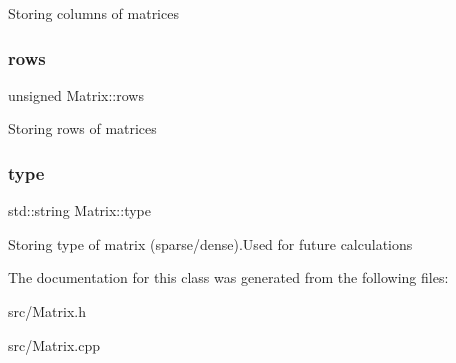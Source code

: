 Storing columns of matrices \mbox{\label{class_matrix_ac1345e89dbffc411f5766c11fc8ebb6a}} 
\subsubsection{\texorpdfstring{rows}{rows}}
{\footnotesize\ttfamily unsigned Matrix\+::rows\hspace{0.3cm}{\ttfamily [protected]}}

Storing rows of matrices \mbox{\label{class_matrix_a3f9973bd9a7ad102959ba74e50631db9}} 
\subsubsection{\texorpdfstring{type}{type}}
{\footnotesize\ttfamily std\+::string Matrix\+::type\hspace{0.3cm}{\ttfamily [protected]}}

Storing type of matrix (sparse/dense).Used for future calculations 

The documentation for this class was generated from the following files\+:\begin{DoxyCompactItemize}
\item 
src/Matrix.\+h\item 
src/Matrix.\+cpp\end{DoxyCompactItemize}
